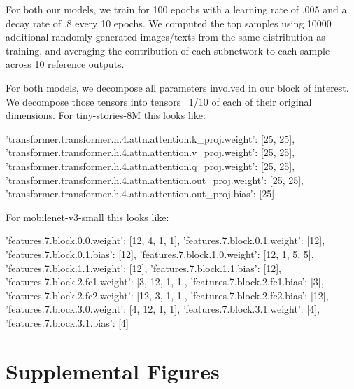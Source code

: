 \documentclass{article}
\theoremstyle{plain}
\theoremstyle{definition}
\theoremstyle{remark}
\begin{document}
For both our models, we train for 100 epochs with a learning rate of .005 and a decay rate of .8 every 10 epochs. We computed the top samples using 10000 additional randomly generated images/texts from the same distribution as training, and averaging the contribution of each subnetwork to each sample across 10 reference outputs. 

For both models, we decompose all parameters involved in our block of interest. We decompose those tensors into tensors ~1/10 of each of their original dimensions. For tiny-stories-8M this looks like:
\begin{code}
    'transformer.transformer.h.4.attn.attention.k_proj.weight': [25, 25],
    'transformer.transformer.h.4.attn.attention.v_proj.weight': [25, 25],
    'transformer.transformer.h.4.attn.attention.q_proj.weight': [25, 25],
    'transformer.transformer.h.4.attn.attention.out_proj.weight': [25, 25],
    'transformer.transformer.h.4.attn.attention.out_proj.bias': [25]
\end{code}

For mobilenet-v3-small this looks like:

\begin{code}
    'features.7.block.0.0.weight': [12, 4, 1, 1],
    'features.7.block.0.1.weight': [12],
    'features.7.block.0.1.bias': [12],
    'features.7.block.1.0.weight': [12, 1, 5, 5],
    'features.7.block.1.1.weight': [12],
    'features.7.block.1.1.bias': [12],
    'features.7.block.2.fc1.weight': [3, 12, 1, 1],
    'features.7.block.2.fc1.bias': [3],
    'features.7.block.2.fc2.weight': [12, 3, 1, 1],
    'features.7.block.2.fc2.bias': [12],
    'features.7.block.3.0.weight': [4, 12, 1, 1],
    'features.7.block.3.1.weight': [4],
    'features.7.block.3.1.bias': [4]
\end{code}

\section{Supplemental Figures}
\end{document}
